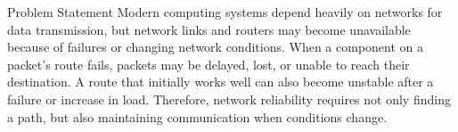 \documentclass[aspectratio=169,11pt]{beamer}
\begin{document}
\begin{block}{Problem Statement}
\small
Modern computing systems depend heavily on networks for data transmission,
but network links and routers may become unavailable because of failures or
changing network conditions. When a component on a packet's route fails,
packets may be delayed, lost, or unable to reach their destination. A route
that initially works well can also become unstable after a failure or increase
in load. Therefore, network reliability requires not only finding a path, but
also maintaining communication when conditions change.
\end{block}

\vspace{0mm}
\end{document}
